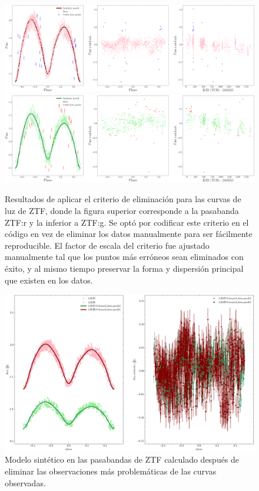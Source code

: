\begin{figure}[!ht]
	\centering
	\includegraphics[scale=0.27]{Metodologia/Secciones/ModeloComputacional/Figures/Figura Malas Observaciones ZTF:r.png}
	\includegraphics[scale=0.27]{Metodologia/Secciones/ModeloComputacional/Figures/Figura Malas Observaciones ZTF:g.png}
	\caption{Resultados de aplicar el criterio de eliminación para las curvas de
	luz de ZTF, donde la figura superior corresponde a la pasabanda ZTF:r y la
	inferior a ZTF:g. Se optó por codificar este criterio en el código en vez de
	eliminar los datos manualmente para ser fácilmente reproducible. El factor
	de escala del criterio fue ajustado manualmente tal que los puntos más
	erróneos sean eliminados con éxito, y al mismo tiempo preservar la forma y
	dispersión principal que existen en los datos.}
	\label{figuraEliminarMalasObservacionesZtf}
\end{figure}

\begin{figure}[!ht]
	\centering
	\includegraphics[scale=0.5]{Metodologia/Secciones/ModeloComputacional/Figures/Figura Modelo Sin Malas Observaciones ZTF.png}
	\caption{Modelo sintético en las pasabandas de ZTF calculado después de
	eliminar las observaciones más problemáticas de las curvas observadas.}
	\label{figuraModeloSinMalasObservacionesZtf}
\end{figure}

